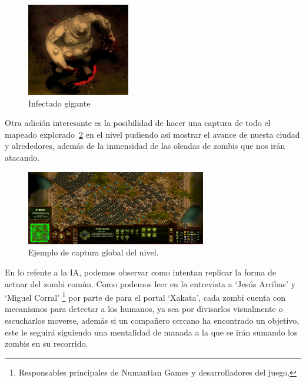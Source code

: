 \begin{figure}[ht]
\centering
\includegraphics[width=0.4\textwidth]{imagenes/marco_teo/referentes/tab_3.png}
\caption{Infectado gigante}
\label{img:tab_3}
\end{figure}

Otra adición interesante es la posibilidad de hacer una captura de todo el mapeado explorado~\ref{img:tab_4}
en el nivel pudiendo así mostrar el avance de nuesta ciudad y alrededores, además de la 
inmensidad de las oleadas de zombis que nos irán atacando.

\begin{figure}[ht]
\centering
\includegraphics[width=0.7\textwidth]{imagenes/marco_teo/referentes/tab_4.png}
\caption{Ejemplo de captura global del nivel.}
\label{img:tab_4}
\end{figure}

En lo refente a la \ac{IA}, podemos observar como intentan replicar la forma de actuar del
zombi común. Como podemos leer en la entrevista a `Jesús Arribas' y `Miguel Corral'
\footnote{Responsables principales de Numantian Games y desarrolladores del juego.} por parte
de \citeauthor*{Sucasas2018} para el portal `Xakata', cada zombi cuenta con mecanismos para 
detectar a los humanos, ya sea por divisarlos visualmente o escucharlos moverse, además si un 
compañero cercano ha encontrado un objetivo, este le seguirá siguiendo 
una mentalidad de manada a la que se irán sumando los zombis en su recorrido.

